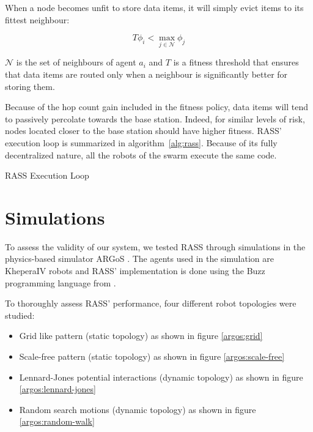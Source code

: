 When a node becomes unfit to store data items, it will simply evict items to its fittest neighbour:

\begin{equation}
    T\phi_i < \max_{j \in \mathcal{N}} \phi_j
\end{equation}

$\mathcal{N}$ is the set of neighbours of agent $a_i$ and $T$ is a fitness threshold that ensures that data items are routed only when a neighbour is significantly better for storing them. 

Because of the hop count gain included in the fitness policy, data items will tend to passively percolate towards the base station. Indeed, for similar levels of risk, nodes located closer to the base station should have higher fitness. RASS' execution loop is summarized in algorithm~\ref{alg:rass}. Because of its fully decentralized nature, all the robots of the swarm execute the same code.

\begin{algorithm}[htbp]
\small
\SetAlgoLined
\DontPrintSemicolon
 \caption{RASS Execution Loop}
 \label{alg:rass}
\end{algorithm}

\section{Simulations}

To assess the validity of our system, we tested RASS through simulations in the physics-based simulator ARGoS \cite{Pinciroli:SI2012}. The agents used
in the simulation are KheperaIV robots \cite{kteam2021kheperaiv} and RASS' implementation is done using the Buzz programming language from \cite{pinciroliBuzz2016}.

To thoroughly assess RASS' performance, four different robot topologies were studied:

\begin{itemize}
    \item Grid like pattern (static topology) as shown in figure \ref{argos:grid}
    \item Scale-free pattern (static topology) as shown in figure \ref{argos:scale-free}
    \item Lennard-Jones potential interactions (dynamic topology) as shown in figure \ref{argos:lennard-jones}
    \item Random search motions (dynamic topology) as shown in figure \ref{argos:random-walk}
\end{itemize}

